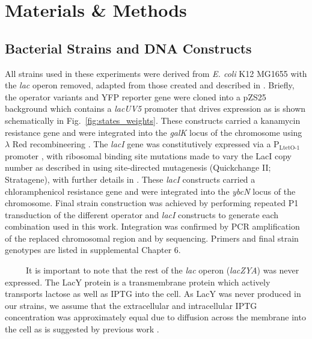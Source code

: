 \documentclass[12pt]{caltech_thesis}
\begin{document}
\hypertarget{materials-methods}{%
\section{Materials \& Methods}\label{materials-methods}}

\hypertarget{bacterial-strains-and-dna-constructs}{%
\subsection{Bacterial Strains and DNA
Constructs}\label{bacterial-strains-and-dna-constructs}}

All strains used in these experiments were derived from \emph{E. coli}
K12 MG1655 with the \emph{lac} operon removed, adapted from those
created and described in \textcite{garcia2011}. Briefly, the operator
variants and YFP reporter gene were cloned into a pZS25 background which
contains a \emph{lacUV5} promoter that drives expression as is shown
schematically in Fig.~\ref{fig:states_weights}. These constructs carried
a kanamycin resistance gene and were integrated into the \emph{galK}
locus of the chromosome using \(\lambda\) Red recombineering
\autocite{sharan2009}. The \emph{lacI} gene was constitutively expressed
via a P\(_\text{LtetO-1}\) promoter \autocite{lutz1997}, with ribosomal
binding site mutations made to vary the LacI copy number as described in
\textcite{salis2009a} using site-directed mutagenesis (Quickchange II;
Stratagene), with further details in \textcite{garcia2011}. These
\emph{lacI} constructs carried a chloramphenicol resistance gene and
were integrated into the \emph{ybcN} locus of the chromosome. Final
strain construction was achieved by performing repeated P1 transduction
\autocite{thomason2007} of the different operator and \emph{lacI}
constructs to generate each combination used in this work. Integration
was confirmed by PCR amplification of the replaced chromosomal region
and by sequencing. Primers and final strain genotypes are listed in
supplemental Chapter 6.

~~~~~It is important to note that the rest of the \emph{lac} operon
(\emph{lacZYA}) was never expressed. The LacY protein is a transmembrane
protein which actively transports lactose as well as IPTG into the cell.
As LacY was never produced in our strains, we assume that the
extracellular and intracellular IPTG concentration was approximately
equal due to diffusion across the membrane into the cell as is suggested
by previous work \autocite{fernandez-castane2012}.
\end{document}
